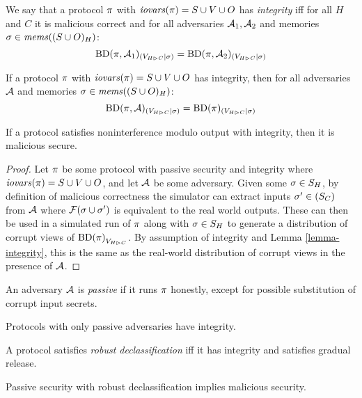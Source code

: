 \begin{definition}[Integrity]
  We say that a protocol $\pi$ with $\mathit{iovars}(\pi) = S \cup V \cup O$ has
  \emph{integrity} iff for all $H$ and $C$ 
  it is malicious correct and for all adversaries $\mathcal{A}_1,\mathcal{A}_2$
  and memories $\sigma \in \mathit{mems}((S \cup O)_H)$:
    $$
    \mathrm{BD}(\pi,\mathcal{A}_1)_{({V_{H \rhd C}}|{\sigma})} =
    \mathrm{BD}(\pi,\mathcal{A}_2)_{({V_{H \rhd C}}|{\sigma})}
    $$
\end{definition}

\begin{lemma}
  \label{lemma-integrity}
  If a protocol $\pi$ with $\mathit{iovars}(\pi) = S \cup V \cup O$ has
  integrity, then for all adversaries $\mathcal{A}$
  and memories $\sigma \in \mathit{mems}((S \cup O)_H)$:
  $$
  \mathrm{BD}(\pi,\mathcal{A})_{({V_{H \rhd C}}|{\sigma})} =
  \mathrm{BD}(\pi)_{({V_{H \rhd C}}|{\sigma})}
  $$
\end{lemma}

\begin{theorem}
  If a protocol satisfies noninterference modulo output with
  integrity, then it is malicious secure.
\end{theorem}

\begin{proof}
  Let $\pi$ be some protocol with passive security and integrity
  where $\mathit{iovars}(\pi) = S \cup V \cup O$, and let $\mathcal{A}$ be some
  adversary.  Given some $\sigma\in S_H$, by definition of malicious
  correctness the simulator can extract inputs $\sigma' \in (S_C)$
  from $\mathcal{A}$ where $\mathcal{F}(\sigma \cup \sigma')$ is equivalent
  to the real world outputs. These can then be used in a simulated run
  of $\pi$ along with $\sigma \in S_H$ to generate a distribution
  of corrupt views of ${\mathrm{BD}(\pi)}_{V_{H \rhd C}}$.
  By assumption of integrity and Lemma \ref{lemma-integrity},
  this is the same as the real-world distribution of corrupt views
  in the presence of $\mathcal{A}$. 
\end{proof}

\begin{definition}
  An adversary $\mathcal{A}$ is \emph{passive} if it runs $\pi$ honestly,
  except for possible substitution of corrupt input secrets.
\end{definition}

\begin{lemma}
  Protocols with only passive adversaries have integrity.
\end{lemma}

\begin{definition}
  A protocol satisfies \emph{robust declassification} iff it has integrity and
  satisfies gradual release. 
\end{definition}

\begin{theorem}
  Passive security with robust declassification implies malicious security.
\end{theorem}
